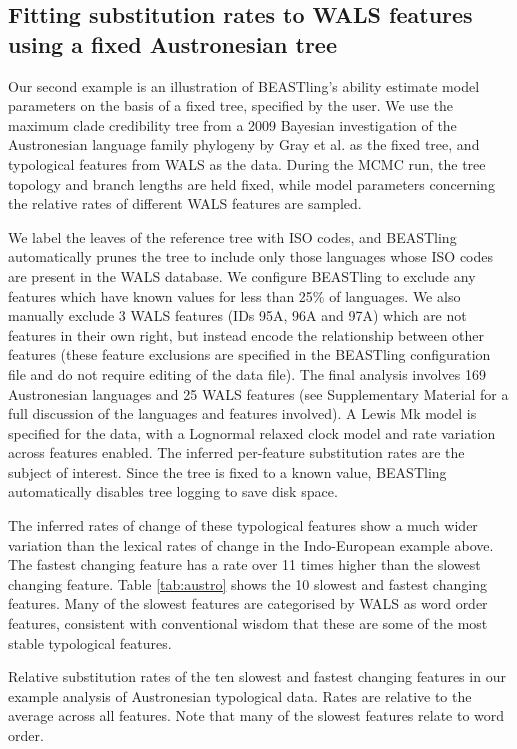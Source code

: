 \documentclass[twocolumn,10pt]{scrartcl}
\begin{document}
\subsection{Fitting substitution rates to WALS features using a fixed Austronesian tree}

Our second example is an illustration of BEASTling's ability estimate model parameters on the basis of a fixed tree, specified by the user.  We use the maximum clade credibility tree from a 2009 Bayesian investigation of the Austronesian language family phylogeny by Gray et al.\cite{Gray2009} as the fixed tree, and typological features from WALS \cite{Dryer2013} as the data.  During the MCMC run, the tree topology and branch lengths are held fixed, while model parameters concerning the relative rates of different WALS features are sampled.

We label the leaves of the reference tree with ISO codes, and BEASTling automatically prunes the tree to include only those languages whose ISO codes are present in the WALS database.  We configure BEASTling to exclude any features which have known values for less than 25\% of languages.  We also manually exclude 3 WALS features (IDs 95A, 96A and 97A) which are not features in their own right, but instead encode the relationship between other features (these feature exclusions are specified in the BEASTling configuration file and do not require editing of the data file).  The final analysis involves 169 Austronesian languages and 25 WALS features (see Supplementary Material for a full discussion of the languages and features involved).  A Lewis Mk model is specified for the data, with a Lognormal relaxed clock model and rate variation across features enabled.  The inferred per-feature substitution rates are the subject of interest.  Since the tree is fixed to a known value, BEASTling automatically disables tree logging to save disk space.

The inferred rates of change of these typological features show a much wider variation than the lexical rates of change in the Indo-European example above.  The fastest changing feature has a rate over 11 times higher than the slowest changing feature.  Table \ref{tab:austro} shows the 10 slowest and fastest changing features.  Many of the slowest features are categorised by WALS as word order features, consistent with conventional wisdom that these are some of the most stable typological features.

\begin{table*}[ht]
	\begin{center}
		
	\end{center}
	\caption{Relative substitution rates of the ten slowest and fastest changing features in our example analysis of Austronesian typological data.  Rates are relative to the average across all features.  Note that many of the slowest features relate to word order.}
\label{tab:austro}
\end{table*}
\end{document}
